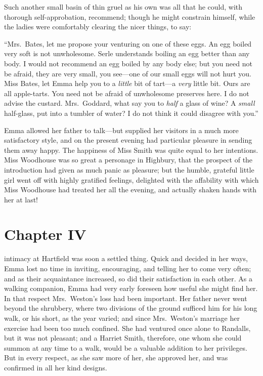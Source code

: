 Such another small basin of thin gruel as his own was all that
he could, with thorough self-approbation, recommend; though he
might constrain himself, while the ladies were comfortably clearing
the nicer things, to say:

``Mrs.\ Bates, let me propose your venturing on one of these eggs.
An egg boiled very soft is not unwholesome.  Serle understands boiling
an egg better than any body.  I would not recommend an egg boiled
by any body else; but you need not be afraid, they are very small,
you see---one of our small eggs will not hurt you.  Miss Bates,
let Emma help you to a \emph{little} bit of tart---a \emph{very} little bit.
Ours are all apple-tarts. You need not be afraid of unwholesome
preserves here.  I do not advise the custard.  Mrs.\ Goddard, what say
you to \emph{half} a glass of wine? A \emph{small} half-glass, put into a tumbler
of water? I do not think it could disagree with you.''

Emma allowed her father to talk---but supplied her visitors in
a much more satisfactory style, and on the present evening had
particular pleasure in sending them away happy.  The happiness
of Miss Smith was quite equal to her intentions.  Miss Woodhouse
was so great a personage in Highbury, that the prospect of the
introduction had given as much panic as pleasure; but the humble,
grateful little girl went off with highly gratified feelings,
delighted with the affability with which Miss Woodhouse had treated
her all the evening, and actually shaken hands with her at last!



\chapter{Chapter IV}


 intimacy at Hartfield was soon a settled thing.
Quick and decided in her ways, Emma lost no time in inviting, encouraging,
and telling her to come very often; and as their acquaintance increased,
so did their satisfaction in each other.  As a walking companion,
Emma had very early foreseen how useful she might find her.
In that respect Mrs.\ Weston's loss had been important.  Her father
never went beyond the shrubbery, where two divisions of the ground
sufficed him for his long walk, or his short, as the year varied;
and since Mrs.\ Weston's marriage her exercise had been too much confined.
She had ventured once alone to Randalls, but it was not pleasant;
and a Harriet Smith, therefore, one whom she could summon at any
time to a walk, would be a valuable addition to her privileges.
But in every respect, as she saw more of her, she approved her,
and was confirmed in all her kind designs.

